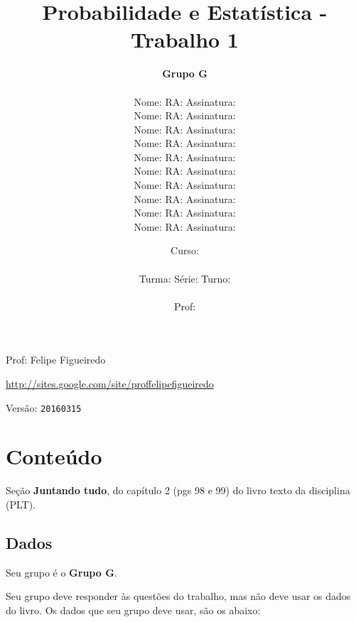 \documentclass[a4paper]{article}
\date{
\bigskip
Curso: \underline{\hspace{8cm}}\\
\ \\
Turma: \underline{\hspace{1cm}} Série: \underline{\hspace{1cm}} Turno:
\underline{\hspace{1cm}}\\
\ \\
Prof: \underline{\hspace{8cm}}\\
}
\title{Probabilidade e Estatística - Trabalho 1}
\author{
{\bf Grupo G}\\
\ \\
Nome: \underline{\hspace{6cm}} RA: \underline{\hspace{2cm}} Assinatura: \underline{\hspace{4cm}}\\
Nome: \underline{\hspace{6cm}} RA: \underline{\hspace{2cm}} Assinatura: \underline{\hspace{4cm}}\\
Nome: \underline{\hspace{6cm}} RA: \underline{\hspace{2cm}} Assinatura: \underline{\hspace{4cm}}\\
Nome: \underline{\hspace{6cm}} RA: \underline{\hspace{2cm}} Assinatura: \underline{\hspace{4cm}}\\
Nome: \underline{\hspace{6cm}} RA: \underline{\hspace{2cm}} Assinatura: \underline{\hspace{4cm}}\\
Nome: \underline{\hspace{6cm}} RA: \underline{\hspace{2cm}} Assinatura: \underline{\hspace{4cm}}\\
Nome: \underline{\hspace{6cm}} RA: \underline{\hspace{2cm}} Assinatura: \underline{\hspace{4cm}}\\
Nome: \underline{\hspace{6cm}} RA: \underline{\hspace{2cm}} Assinatura: \underline{\hspace{4cm}}\\
Nome: \underline{\hspace{6cm}} RA: \underline{\hspace{2cm}} Assinatura: \underline{\hspace{4cm}}\\
Nome: \underline{\hspace{6cm}} RA: \underline{\hspace{2cm}} Assinatura: \underline{\hspace{4cm}}\\
}
\begin{document}
\maketitle
\newpage

\parbox[c]{.825\textwidth}{\raggedright%
{Prof: Felipe Figueiredo\par}
{\url{http://sites.google.com/site/proffelipefigueiredo}\par}
}

Versão: \verb|20160315|




\section{Conteúdo}

Seção {\bf Juntando tudo}, do capítulo 2 (pgs 98 e 99) do livro texto da disciplina (PLT). 

\subsection{Dados}
Seu grupo é o {\bf Grupo G}.

Seu grupo deve responder às questões do trabalho, mas não deve usar os dados do livro. Os dados que seu grupo deve usar, são os abaixo:
\end{document}
